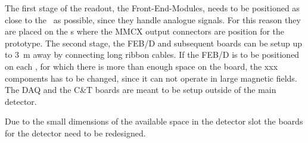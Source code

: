 \documentclass[../BTOF_summary.tex]{subfiles}
\begin{document}
The first stage of the readout, the Front-End-Modules, needs to be positioned as close to the \sipms\ as possible, since they handle analogue signals.
For this reason they are placed on the \railboard s where the MMCX output connectors are position for the prototype.
The second stage, the FEB/D and subsequent boards can be setup up to \SI{3}{m} away by connecting long ribbon cables.
If the FEB/D is to be positioned on each \sm , for which there is more than enough space on the board, the xxx components has to be changed, since it can not operate in large magnetic fields.
The DAQ and the C\&T boards are meant to be setup outside of the main detector.

Due to the small dimensions of the available space in the detector slot the boards for the detector need to be redesigned.
\end{document}
